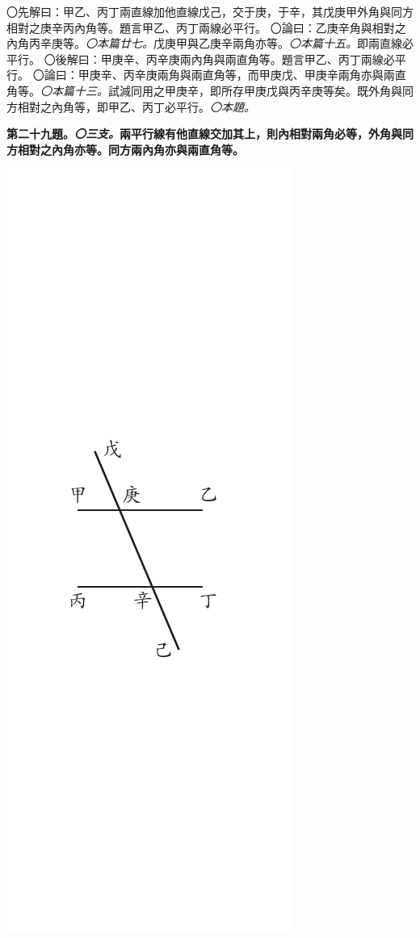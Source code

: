 \documentclass[12pt,b5paper,landscape]{article}
\newcommand{\ccom}[1]{{\footnotesize \emph{〇#1}}}
\newcommand{\bcom}[1]{〇#1}
\newcommand{\cthm}[1]{{
\vspace{8pt}

\bfseries #1}}
\begin{document}
\begin{multicols}{2}
\bcom{先解曰：甲乙、丙丁兩直線加他直線戊己，交于庚，于辛，其戊庚甲外角與同方相對之庚辛丙內角等。題言甲乙、丙丁兩線必平行。}
\bcom{論曰：乙庚辛角與相對之內角丙辛庚等。\ccom{本篇廿七。}戊庚甲與乙庚辛兩角亦等。\ccom{本篇十五。}即兩直線必平行。}
\bcom{後解曰：甲庚辛、丙辛庚兩內角與兩直角等。題言甲乙、丙丁兩線必平行。}
\bcom{論曰：甲庚辛、丙辛庚兩角與兩直角等，而甲庚戊、甲庚辛兩角亦與兩直角等。\ccom{本篇十三。}試減同用之甲庚辛，即所存甲庚戊與丙辛庚等矣。既外角與同方相對之內角等，即甲乙、丙丁必平行。\ccom{本題。}}

\cthm{第二十九題。\ccom{三支。}兩平行線有他直線交加其上，則內相對兩角必等，外角與同方相對之內角亦等。同方兩內角亦與兩直角等。}
\begin{center}
      \includegraphics[angle=90]{eu75}

\end{center}
\end{multicols}
\end{document}
